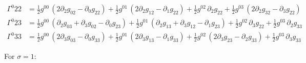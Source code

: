 \documentclass[
]{article}
\begin{document}
\[\begin{aligned}
\Gamma^{0}_{}{22} &= \tfrac{1}{2} g^{00}\, \left( 2 \partial_{2} g_{02} - \partial_{0} g_{22} \right) + \tfrac{1}{2} g^{01}\, \left( 2 \partial_{2} g_{12} - \partial_{1} g_{22} \right) + \tfrac{1}{2} g^{02}\, \partial_{2} g_{22} + \tfrac{1}{2} g^{03}\, \left( 2 \partial_{2} g_{32} - \partial_{3} g_{22} \right) \\
\Gamma^{0}_{}{23} &= \tfrac{1}{2} g^{00}\, \left( \partial_{2} g_{03} + \partial_{3} g_{02} - \partial_{0} g_{23} \right) + \tfrac{1}{2} g^{01}\, \left( \partial_{2} g_{13} + \partial_{3} g_{12} - \partial_{1} g_{23} \right) + \tfrac{1}{2} g^{02}\, \partial_{3} g_{22} + \tfrac{1}{2} g^{03}\, \partial_{2} g_{33} \\
\Gamma^{0}_{}{33} &= \tfrac{1}{2} g^{00}\, \left( 2 \partial_{3} g_{03} - \partial_{0} g_{33} \right) + \tfrac{1}{2} g^{01}\, \left( 2 \partial_{3} g_{13} - \partial_{1} g_{33} \right) + \tfrac{1}{2} g^{02}\, \left( 2 \partial_{3} g_{23} - \partial_{2} g_{33} \right) + \tfrac{1}{2} g^{03}\, \partial_{3} g_{33}
\end{aligned}\]

For \(\sigma = 1\):
\end{document}
